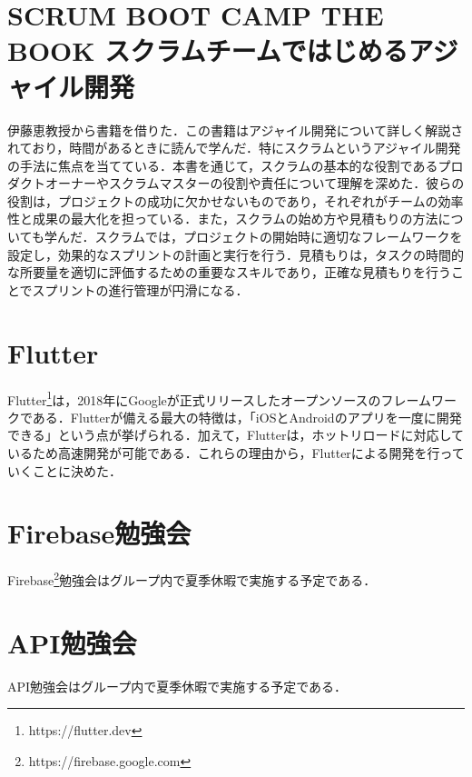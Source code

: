 \section{SCRUM BOOT CAMP THE BOOK スクラムチームではじめるアジャイル開発}
伊藤恵教授から書籍\cite{scrumb}を借りた．この書籍はアジャイル開発について詳しく解説されており，時間があるときに読んで学んだ．特にスクラムというアジャイル開発の手法に焦点を当てている．本書を通じて，スクラムの基本的な役割であるプロダクトオーナーやスクラムマスターの役割や責任について理解を深めた．彼らの役割は，プロジェクトの成功に欠かせないものであり，それぞれがチームの効率性と成果の最大化を担っている．また，スクラムの始め方や見積もりの方法についても学んだ．スクラムでは，プロジェクトの開始時に適切なフレームワークを設定し，効果的なスプリントの計画と実行を行う．見積もりは，タスクの時間的な所要量を適切に評価するための重要なスキルであり，正確な見積もりを行うことでスプリントの進行管理が円滑になる．


\section{Flutter}
Flutter\footnote{https://flutter.dev}は，2018年にGoogleが正式リリースしたオープンソースのフレームワークである．Flutterが備える最大の特徴は，「iOSとAndroidのアプリを一度に開発できる」という点が挙げられる．加えて，Flutterは，ホットリロードに対応しているため高速開発が可能である．これらの理由から，Flutterによる開発を行っていくことに決めた．

\section{Firebase勉強会}
Firebase\footnote{https://firebase.google.com}勉強会はグループ内で夏季休暇で実施する予定である．

\section{API勉強会}
API勉強会はグループ内で夏季休暇で実施する予定である．

